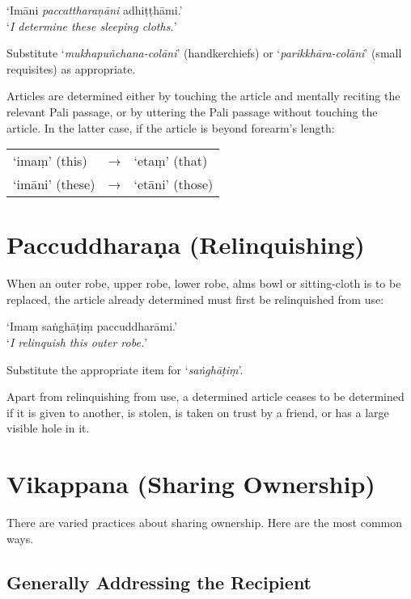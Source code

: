 ‘Imāni \emph{paccattharaṇāni} adhiṭṭhāmi.’\\
‘\emph{I determine these sleeping cloths.}’

Substitute ‘\emph{mukhapuñchana-colāni}’ (handkerchiefs) or
‘\emph{parikkhāra-colāni}’ (small requisites) as appropriate.

Articles are determined either by touching the article and mentally reciting the
relevant Pali passage, or by uttering the Pali passage without touching the
article. In the latter case, if the article is beyond forearm's length:

\ifhandbookedition
\enlargethispage{\baselineskip}
\fi

\begin{tabular}{@{}lll@{}}
‘imaṃ’ (this) & → & ‘etaṃ’ (that)\\
‘imāni’ (these) & → & ‘etāni’ (those)\\
\end{tabular}


\section{Paccuddharaṇa (Relinquishing)}

When an outer robe, upper robe, lower robe, alms bowl or sitting-cloth is to be
replaced, the article already determined must first be relinquished from use:

‘Imaṃ saṅghāṭiṃ paccuddharāmi.’\\
‘\emph{I relinquish this outer robe.}’ 

Substitute the appropriate item for ‘\emph{saṅghāṭiṃ}’.

Apart from relinquishing from use, a determined article ceases to be determined
if it is given to another, is stolen, is taken on trust by a friend, or has a
large visible hole in it.

\section{Vikappana (Sharing Ownership)}

There are varied practices about sharing ownership. Here are the most common
ways.

\subsection{Generally Addressing the Recipient}
\label{general-address}

